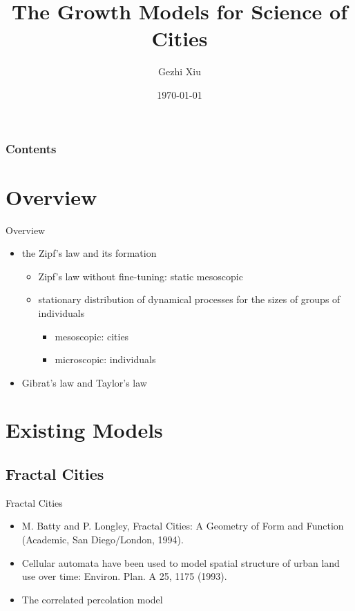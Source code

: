 \documentclass{beamer}
\title[Growth Models]{The Growth Models for Science of Cities}
\author[G. Xiu]{Gezhi Xiu} %
\institute[IRSGIS PKU]{Complexity Research Group,\\Peking University}
\date[\today]{\today}
\begin{document}
\maketitle
\begin{frame} \frametitle{Contents}
\tableofcontents
\end{frame}
\section{Overview}
\begin{frame}{Overview}
  \begin{itemize}
    \item the Zipf's law and its formation
    \begin{itemize}
      \item Zipf's law without fine-tuning: static mesoscopic
      \item stationary distribution of dynamical processes for the sizes of groups of individuals
      \begin{itemize}
        \item mesoscopic: cities
        \item microscopic: individuals
      \end{itemize}
    \end{itemize}
    \item Gibrat's law and Taylor's law
  \end{itemize}
\end{frame}

\section{Existing Models}

\subsection{Fractal Cities}

\begin{frame}{Fractal Cities}
  \begin{itemize}
    \item M. Batty and P. Longley, Fractal Cities: A Geometry of Form
    and Function (Academic, San Diego/London, 1994).
    \item Cellular automata have been used to model spatial structure of urban land use over time: Environ. Plan. A 25, 1175 (1993).
    \item The correlated percolation model
    
  \end{itemize}
\end{frame}
\end{document}
